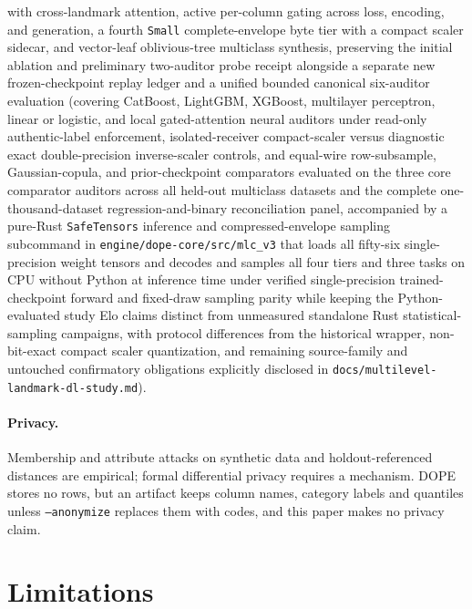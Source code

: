 with cross-landmark attention, active per-column gating across loss, encoding, and generation, a
fourth \texttt{Small} complete-envelope byte tier with a compact scaler sidecar, and vector-leaf
oblivious-tree multiclass synthesis, preserving the initial ablation and preliminary two-auditor
probe receipt alongside a separate new frozen-checkpoint replay ledger and a unified bounded canonical
six-auditor evaluation (covering CatBoost, LightGBM, XGBoost, multilayer perceptron, linear or logistic,
and local gated-attention neural auditors under read-only authentic-label enforcement, isolated-receiver
compact-scaler versus diagnostic exact double-precision inverse-scaler controls, and equal-wire
row-subsample, Gaussian-copula, and prior-checkpoint comparators evaluated on the three core comparator
auditors across all held-out multiclass datasets and the complete one-thousand-dataset
regression-and-binary reconciliation panel, accompanied by a pure-Rust \texttt{SafeTensors}
inference and compressed-envelope sampling subcommand in \texttt{engine/dope-core/src/mlc\_v3} that
loads all fifty-six single-precision weight tensors and decodes and samples all four tiers and three
tasks on CPU without Python at inference time under verified single-precision trained-checkpoint forward
and fixed-draw sampling parity while keeping the Python-evaluated study Elo claims distinct from
unmeasured standalone Rust statistical-sampling campaigns, with protocol differences from the
historical wrapper, non-bit-exact compact scaler quantization, and remaining source-family and
untouched confirmatory obligations explicitly disclosed in
\texttt{docs/multilevel-landmark-dl-study.md}).

\paragraph{Privacy.} Membership and attribute attacks on synthetic data
\citep{shokri2017membership,stadler2022groundhog,vanbreugel2023domias} and holdout-referenced distances
\citep{platzer2021holdout} are empirical; formal differential privacy \citep{dwork2014foundations} requires
a mechanism. DOPE stores no rows, but an artifact keeps column names, category labels
and quantiles unless \texttt{--anonymize} replaces them with codes, and this paper makes no privacy claim.

\section{Limitations}
\label{sec:limits}

